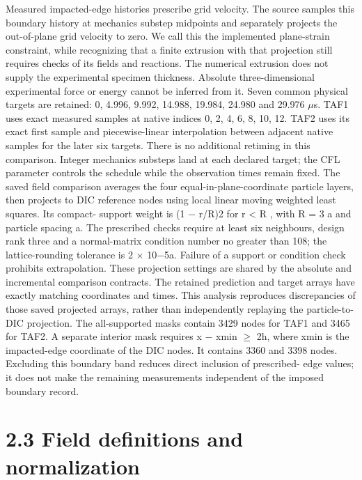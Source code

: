 \documentclass[11pt]{article}
\begin{document}
Measured impacted-edge histories prescribe grid velocity. The source samples this boundary history
at mechanics substep midpoints and separately projects the out-of-plane grid velocity to zero. We
call this the implemented plane-strain constraint, while recognizing that a finite extrusion with that
projection still requires checks of its fields and reactions. The numerical extrusion does not supply
the experimental specimen thickness. Absolute three-dimensional experimental force or energy
cannot be inferred from it.
Seven common physical targets are retained: 0, 4.996, 9.992, 14.988, 19.984, 24.980 and
29.976 \ensuremath{\mu}s. TAF1 uses exact measured samples at native indices 0, 2, 4, 6, 8, 10, 12. TAF2 uses
its exact first sample and piecewise-linear interpolation between adjacent native samples for the
later six targets. There is no additional retiming in this comparison. Integer mechanics substeps
land at each declared target; the CFL parameter controls the schedule while the observation times
remain fixed.
The saved field comparison averages the four equal-in-plane-coordinate particle layers, then
projects to DIC reference nodes using local linear moving weighted least squares. Its compact-
support weight is (1 \ensuremath{-} r/R)2 for r < R , with R = 3 a and particle spacing a. The prescribed
checks require at least six neighbours, design rank three and a normal-matrix condition number
no greater than 108; the lattice-rounding tolerance is 2 \ensuremath{\times} 10\ensuremath{-}5a. Failure of a support or condition
check prohibits extrapolation. These projection settings are shared by the absolute and incremental
comparison contracts. The retained prediction and target arrays have exactly matching coordinates
and times. This analysis reproduces discrepancies of those saved projected arrays, rather than
independently replaying the particle-to-DIC projection.
The all-supported masks contain 3429 nodes for TAF1 and 3465 for TAF2. A separate interior
mask requires x \ensuremath{-} xmin \ensuremath{\geq} 2h, where xmin is the impacted-edge coordinate of the DIC nodes. It
contains 3360 and 3398 nodes. Excluding this boundary band reduces direct inclusion of prescribed-
edge values; it does not make the remaining measurements independent of the imposed boundary
record.

\section*{2.3 Field definitions and normalization}
\end{document}
